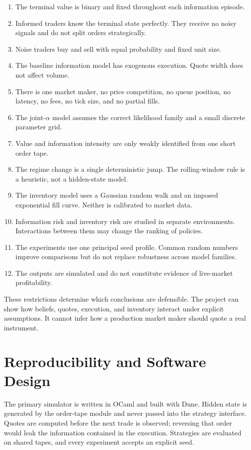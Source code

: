 \documentclass[11pt]{article}
\begin{document}
\begin{enumerate}
\item The terminal value is binary and fixed throughout each information episode.
\item Informed traders know the terminal state perfectly. They receive no noisy signals and do not split orders strategically.
\item Noise traders buy and sell with equal probability and fixed unit size.
\item The baseline information model has exogenous execution. Quote width does not affect volume.
\item There is one market maker, no price competition, no queue position, no latency, no fees, no tick size, and no partial fills.
\item The joint-$\alpha$ model assumes the correct likelihood family and a small discrete parameter grid.
\item Value and information intensity are only weakly identified from one short order tape.
\item The regime change is a single deterministic jump. The rolling-window rule is a heuristic, not a hidden-state model.
\item The inventory model uses a Gaussian random walk and an imposed exponential fill curve. Neither is calibrated to market data.
\item Information risk and inventory risk are studied in separate environments. Interactions between them may change the ranking of policies.
\item The experiments use one principal seed profile. Common random numbers improve comparisons but do not replace robustness across model families.
\item The outputs are simulated and do not constitute evidence of live-market profitability.
\end{enumerate}

These restrictions determine which conclusions are defensible. The project can show how beliefs, quotes, execution, and inventory interact under explicit assumptions. It cannot infer how a production market maker should quote a real instrument.

\section{Reproducibility and Software Design}

The primary simulator is written in OCaml and built with Dune. Hidden state is generated by the order-tape module and never passed into the strategy interface. Quotes are computed before the next trade is observed; reversing that order would leak the information contained in the execution. Strategies are evaluated on shared tapes, and every experiment accepts an explicit seed.
\end{document}
